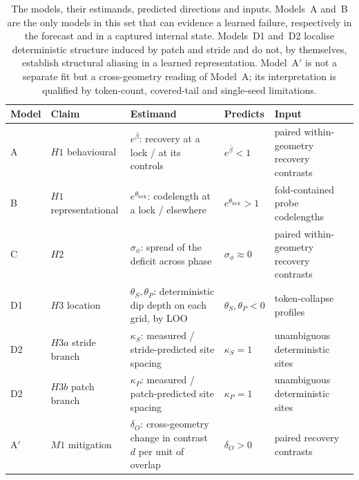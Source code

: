\begin{table}[!b]
    \centering
    \small
    \begin{tabular}{@{}lllll@{}}
        \toprule
        \textbf{Model} & \textbf{Claim} & \textbf{Estimand} & \textbf{Predicts} & \textbf{Input} \\
        \midrule
        A  & $H1$ behavioural      & $e^{\bar\beta}$: recovery at a lock / at its controls & $e^{\bar\beta}<1$ & paired within-geometry recovery contrasts \\
        B  & $H1$ representational & $e^{\theta_{\mathrm{lock}}}$: codelength at a lock / elsewhere & $e^{\theta_{\mathrm{lock}}}>1$ & fold-contained probe codelengths \\
        C  & $H2$                  & $\sigma_\phi$: spread of the deficit across phase & $\sigma_\phi\approx 0$ & paired within-geometry recovery contrasts \\
        D1 & $H3$ location         & $\theta_S,\theta_P$: deterministic dip depth on each grid, by LOO & $\theta_S,\theta_P<0$ & token-collapse profiles \\
        D2 & $H3a$ stride branch   & $\kappa_S$: measured / stride-predicted site spacing & $\kappa_S=1$ & unambiguous deterministic sites \\
        D2 & $H3b$ patch branch    & $\kappa_P$: measured / patch-predicted site spacing & $\kappa_P=1$ & unambiguous deterministic sites \\
        A$'$ & $M1$ mitigation     & $\delta_O$: cross-geometry change in contrast $d$ per unit of overlap & $\delta_O>0$ & paired recovery contrasts \\
        \bottomrule
    \end{tabular}
    \caption{The models, their estimands, predicted directions and inputs. Models~A and~B are the only models in this set that can evidence a learned failure, respectively in the forecast and in a captured internal state. Models~D1 and~D2 localise deterministic structure induced by patch and stride and do not, by themselves, establish structural aliasing in a learned representation. Model~A$'$ is not a separate fit but a cross-geometry reading of Model~A; its interpretation is qualified by token-count, covered-tail and single-seed limitations.}
    \label{tab:bayesModels}
\end{table}
